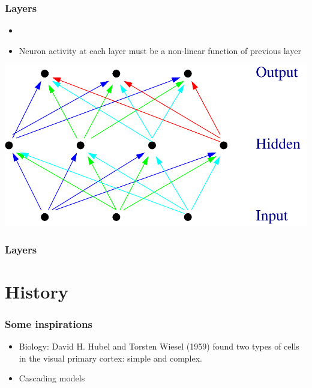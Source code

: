 \begin{frame}
  \frametitle{Layers}
  \begin{itemize}
  \item {}
  \item Neuron activity at each layer must be a non-linear function of
    previous layer
  \end{itemize}
  \includegraphics[width=.6\textwidth]{neural-network.pdf}
\end{frame}

\begin{frame}
  \frametitle{Layers}
  
\end{frame}

\section{History}

\begin{frame}
  \frametitle{Some inspirations}
  \begin{itemize}
  \item Biology: David H. Hubel and Torsten Wiesel (1959) found two
    types of cells in the visual primary cortex: simple and complex.
  \item Cascading models
  \end{itemize}

\end{frame}

